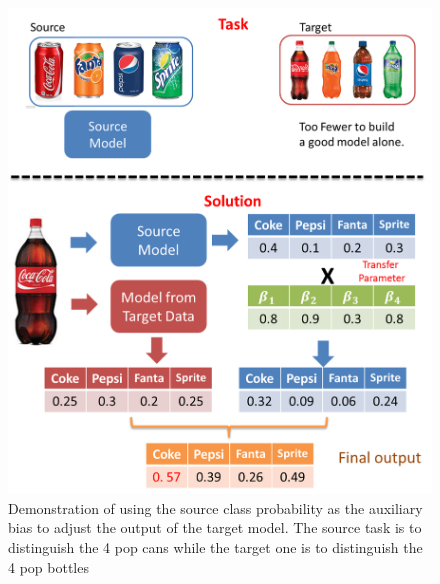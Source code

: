 \begin{figure}
	\centering
	\includegraphics[scale=.7]{pakdd/fig/explain.png}
	\caption{Demonstration of using the source class probability as the auxiliary bias to adjust the output of the target model. The source task is to distinguish the 4 pop cans while the target one is to distinguish the 4 pop bottles}
	\label{fig:ab}
\end{figure}










